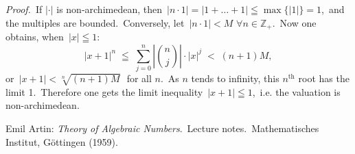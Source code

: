 \documentclass[12pt]{article}
\theoremstyle{definition}
\begin{document}
{\em Proof.}\, If $|\cdot|$ is non-archimedean, then\, $|n\cdot 1| = |1\!+\ldots+\!1| \leqq\max\{|1|\} = 1$,\, and the multiples are bounded.\, Conversely, let\, 
$|n\cdot1| < M \,\, \forall n\in\mathbb{Z}_+$.\,  Now one obtains, when\, $|x|\leqq 1$:
$$|x\!+\!1|^n \;\leqq\; \sum_{j = 0}^n \left|{n\choose j}\right|\cdot|x|^j \;<\; (n+1)M,$$
or\, $|x\!+\!1| < \sqrt[n]{(n\!+\!1)M}$\,\, for all $n$.\, As $n$ tends to infinity, this $n^\mathrm{th}$ root has the limit 1.\, Therefore one gets the limit inequality\, $|x\!+\!1| \leqq 1$,\, i.e. the valuation is non-archimedean.

\begin{thebibliography}{9}
 {\sc Emil Artin}: {\em Theory of Algebraic Numbers}.\, Lecture notes.\, Mathematisches Institut, G\"ottingen (1959).
\end{thebibliography}
\end{document}
